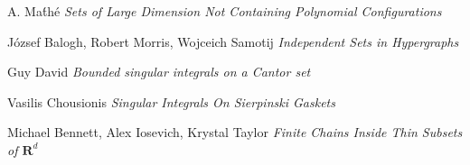 \documentclass{article}
\theoremstyle{plain}
\theoremstyle{plain}
\begin{document}
\begin{multicols}{2}
\begin{thebibliography}{9}
A. Ma\'{t}h\'{e}
\textit{Sets of Large Dimension Not Containing Polynomial Configurations}

J\'{o}zsef Balogh, Robert Morris, Wojceich Samotij
\textit{Independent Sets in Hypergraphs}

Guy David
\textit{Bounded singular integrals on a Cantor set}

Vasilis Chousionis
\textit{Singular Integrals On Sierpinski Gaskets}

Michael Bennett, Alex Iosevich, Krystal Taylor
\textit{Finite Chains Inside Thin Subsets of $\mathbf{R}^d$}

\end{thebibliography}

\end{multicols}
\end{document}
